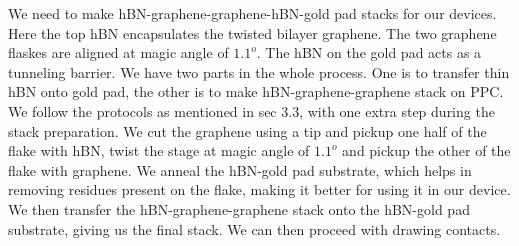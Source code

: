 We need to make hBN-graphene-graphene-hBN-gold pad stacks for our devices. Here the top hBN encapsulates the twisted bilayer graphene. The two graphene flaskes are aligned at magic angle of $1.1 ^o$. The hBN on the gold pad acts as a tunneling barrier. We have two parts in the whole process. One is to transfer thin hBN onto gold pad, the other is to make hBN-graphene-graphene stack on PPC. We follow the protocols as mentioned in sec 3.3, with one extra step during the stack preparation. We cut the graphene using a tip and pickup one half of the flake with hBN, twist the stage at magic angle of $1.1 ^o$ and pickup the other of the flake with graphene. We anneal the hBN-gold pad substrate, which helps in removing residues present on the flake, making it better for using it in our device. We then transfer the hBN-graphene-graphene stack onto the hBN-gold pad substrate, giving us the final stack. We can then proceed with drawing contacts. 